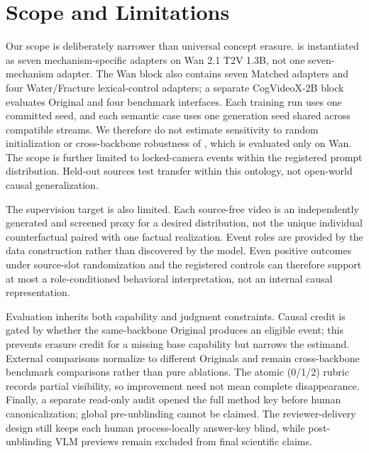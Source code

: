 \section{Scope and Limitations}
\label{sec:limitations}

Our scope is deliberately narrower than universal concept erasure.
\methodshort{} is instantiated as seven mechanism-specific adapters on Wan 2.1
T2V 1.3B, not one seven-mechanism adapter.  The Wan block also contains seven
Matched adapters and four Water/Fracture lexical-control adapters; a separate
CogVideoX-2B block evaluates Original and four benchmark interfaces.  Each
training run uses one committed seed, and each semantic case uses one
generation seed shared across compatible streams.  We therefore do not
estimate sensitivity to random initialization or cross-backbone robustness of
\methodshort{}, which is evaluated only on Wan.  The scope is further limited
to locked-camera events within the registered prompt distribution.  Held-out
sources test transfer within this ontology, not open-world causal
generalization.

The supervision target is also limited.  Each source-free video is an
independently generated and screened proxy for a desired distribution, not the
unique individual counterfactual paired with one factual realization.  Event
roles are provided by the data construction rather than discovered by the
model.  Even positive outcomes under source-slot randomization and the
registered controls can therefore support at most a role-conditioned
behavioral interpretation, not an internal causal representation.

Evaluation inherits both capability and judgment constraints.  Causal credit
is gated by whether the same-backbone Original produces an eligible event;
this prevents erasure credit for a missing base capability but narrows the
estimand.  External comparisons normalize to different Originals and remain
cross-backbone benchmark comparisons rather than pure ablations.  The atomic
(0/1/2) rubric records partial visibility, so improvement need not mean
complete disappearance.  Finally, a separate read-only audit opened the full
method key before human canonicalization; global pre-unblinding cannot be
claimed.  The reviewer-delivery design still keeps each human process-locally
answer-key blind, while post-unblinding VLM previews remain excluded from final
scientific claims.

